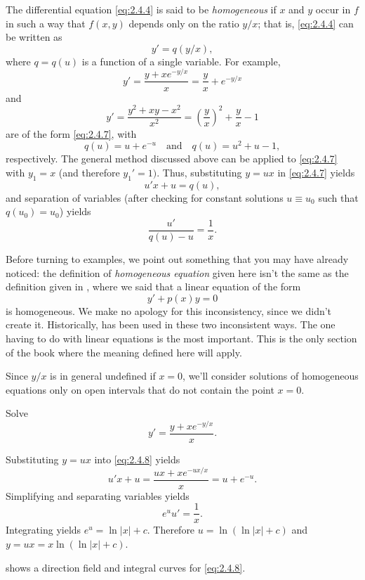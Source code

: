 The differential equation \eqref{eq:2.4.4}
is said to be
\emph{\color{blue}homogeneous}
if  $x$ and $y$ occur in $f$ in such a way that  $f(x,y)$ depends only
on the ratio $y/x$; that is, \eqref{eq:2.4.4} can be written as
\begin{equation} \label{eq:2.4.7}
y'=q(y/x),
\end{equation}
where $q=q(u)$ is a function of a single variable.
For example,
\[
y'=\frac{y+xe^{-y/x}}{x}=\frac{y}{x}+e^{-y/x}
\]
and
\[
y'=\frac{y^2+xy-x^2}{x^2}=\left(\frac{y}{x}\right)^2+\frac{y}{x}
-1
\]
are of the form  \eqref{eq:2.4.7}, with
\[
q(u)=u+e^{-u}\quad\text{and}\quad  q(u)=u^2+u-1,
\]
respectively. The general method discussed above can be
applied to
\eqref{eq:2.4.7} with $y_1=x$ (and therefore $y_1'=1)$. Thus,
substituting $y=ux$ in \eqref{eq:2.4.7} yields
\[
u'x+u=q(u),
\]
and separation of variables (after checking for constant
solutions $u\equiv u_0$ such that $q(u_0)=u_0$) yields
\[
\frac{u'}{q(u)-u}=\frac{1}{x}.
\]

Before turning to examples, we point out something that you may have
already noticed: the definition of
\emph{\color{blue}homogeneous equation}
given here isn't  the same as the definition given in
, where we said that a linear equation of the
form
\[
y'+p(x)y=0
\]
is homogeneous. We make no apology for this inconsistency, since we
didn't create it. Historically,  has been
used in these two inconsistent ways. The one
having to do with linear equations is the most important. This
is the only section of the book where the meaning defined here will
apply.

Since $y/x$ is in general undefined if $x=0$, we'll consider
solutions of homogeneous equations only on open intervals that do
not contain the point $x=0$.

\begin{example}\label{example:2.4.2}
Solve
\begin{equation} \label{eq:2.4.8}
y'=\frac{y+xe^{-y/x}}{x}.
\end{equation}
\end{example}

\begin{solution}
Substituting  $y=ux$
into \eqref{eq:2.4.8} yields
\[
u'x+u =  \frac{ux+xe^{-ux/x}}{x} = u+e^{-u}.
\]
 Simplifying and separating variables yields
\[
e^uu'=\frac{1}{x}.
\]
Integrating yields
$e^u=\ln |x|+c$.
Therefore
$u=\ln(\ln|x|+c)$ and
$y=ux=x \ln (\ln |x|+c)$.

 shows
a direction field and integral curves for \eqref{eq:2.4.8}.
\end{solution}

